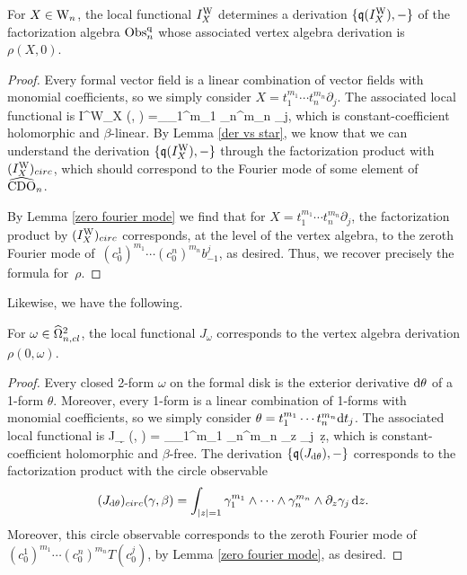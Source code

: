 \begin{lemma}
For $X \in {{\rm W}_n}$, the local functional $I_X^{\rm W}$ determines 
a derivation $\{\frak{q}(I_X^{\rm W}),-\}$ of the factorization algebra ${\rm Obs}^{\rm q}_n$ 
whose associated vertex algebra derivation is~$\rho(X,0)$.
\end{lemma}

\begin{proof}
Every formal vector field is a linear combination of vector fields with monomial coefficients,
so we simply consider  $X = t^{m_1}_1 \cdots t^{m_n}_n \partial_j$.
The associated local functional is
\ben
I^{\rm W}_X (\gamma, \beta) =\int_\CC\gamma_1^{m_1} \wedge \cdots \wedge \gamma_n^{m_n} \wedge \beta_j,
\een 
which is constant-coefficient holomorphic and $\beta$-linear.
By Lemma \ref{der vs star}, we know that we can understand the derivation $\{\frak{q}(I^{\rm W}_X),-\}$ 
through the factorization product with $(I^{\rm W}_X)_{circ}$, 
which should correspond to the Fourier mode of some element of~$\widehat{\rm CDO}_n$.

By Lemma \ref{zero fourier mode} we find that for $X = t^{m_1}_1 \cdots t^{m_n}_n \partial_j$,
the factorization product by $(I^{\rm W}_X)_{circ}$ corresponds, at the level of the vertex algebra, to the zeroth Fourier mode of~$(c^1_0)^{m_1} \cdots (c^n_0)^{m_n} b^j_{-1}$, as desired. Thus, we recover precisely the formula for~$\rho$.
\end{proof}

Likewise, we have the following.

\begin{lemma}
For $\omega \in \widehat{\Omega}^2_{n,cl}$, the local functional $J_\omega$ corresponds to the vertex algebra derivation $\rho(0,\omega)$.
\end{lemma}

\begin{proof}
Every closed 2-form $\omega$ on the formal disk is the exterior derivative ${\rm d} \theta$ of a 1-form $\theta$. 
Moreover, every 1-form is a linear combination of 1-forms with monomial coefficients,
so we simply consider  $\theta = t^{m_1}_1 \cdots t^{m_n}_n {\rm d} t_j$.
The associated local functional is
\ben
J_{\d \theta} (\gamma, \beta) = \int_\CC\gamma_1^{m_1} \wedge \cdots\wedge \gamma_n^{m_n} \wedge \partial_z \gamma_j \,\d z,
\een 
which is constant-coefficient holomorphic and $\beta$-free.
The derivation $\{\frak{q}(J_{{\rm d} \theta}),-\}$ corresponds to the factorization product with the circle observable
\[
(J_{{\rm d} \theta})_{circ} (\gamma, \beta) =\int_{|z|=1}\gamma_1^{m_1} \wedge \cdots\wedge \gamma_n^{m_n} \wedge \partial_z \gamma_j \,{\rm d} z.
\]
Moreover, this circle observable corresponds to the zeroth Fourier mode of $(c^1_0)^{m_1} \cdots (c^n_0)^{m_n} T(c^j_0)$, by Lemma \ref{zero fourier mode}, as desired.
\end{proof}

